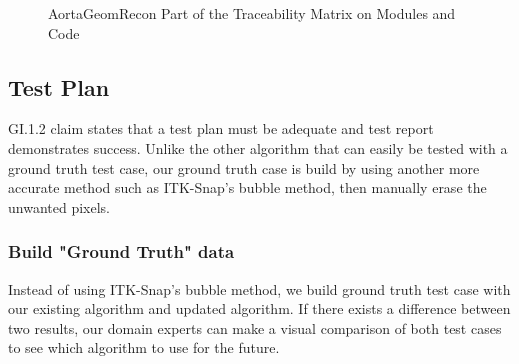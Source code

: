 \begin{figure}[H]
    \centering
    \caption[AortaGeomRecon Part of the Traceability Matrix on Modules and Code]{AortaGeomRecon Part of the Traceability Matrix on Modules and Code}
    \label{fig_agr_mtm_modules_code}
\end{figure}

\subsection{Test Plan}

GI.1.2 claim states that a test plan must be adequate and test report demonstrates success. Unlike the other algorithm that can easily be tested with a ground truth test case, our ground truth case is build by using another more accurate method such as ITK-Snap's bubble method, then manually erase the unwanted pixels.

\subsubsection{Build "Ground Truth" data}
Instead of using ITK-Snap's bubble method, we build ground truth test case with our existing algorithm and updated algorithm. If there exists a difference between two results, our domain experts can make a visual comparison of both test cases to see which algorithm to use for the future.

